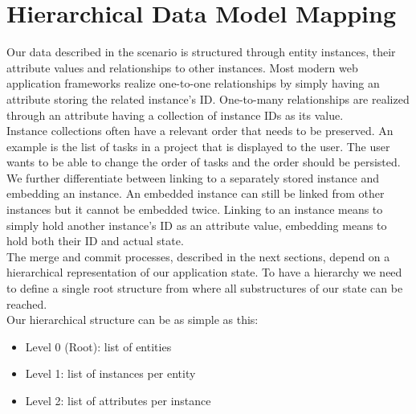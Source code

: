 
\section{Hierarchical Data Model Mapping}
Our data described in the scenario is structured through entity instances, their attribute values and relationships to other instances.
Most modern web application frameworks realize one-to-one relationships by simply having an attribute storing the related instance's ID.
One-to-many relationships are realized through an attribute having a collection of 
instance IDs as its value.\\
Instance collections often have a relevant order that needs to be preserved.
An example is the list of tasks in a project that is displayed to the user.
The user wants to be able to change the order of tasks and the order should be persisted.\\
We further differentiate between linking to a separately stored instance and  embedding an instance.
An embedded instance can still be linked from other instances but it cannot be embedded twice.
Linking to an instance means to simply hold another instance's ID as an attribute value, embedding means to hold both their ID and actual state.\\

The merge and commit processes, described in the next sections, depend on a hierarchical representation of our application state.
To have a hierarchy we need to define a single root structure from where all substructures of our state can be reached.\\
Our hierarchical structure can be as simple as this:

\begin{itemize}
\item Level 0 (Root): list of entities
\item Level 1: list of instances per entity
\item Level 2: list of attributes per instance
\end{itemize}

